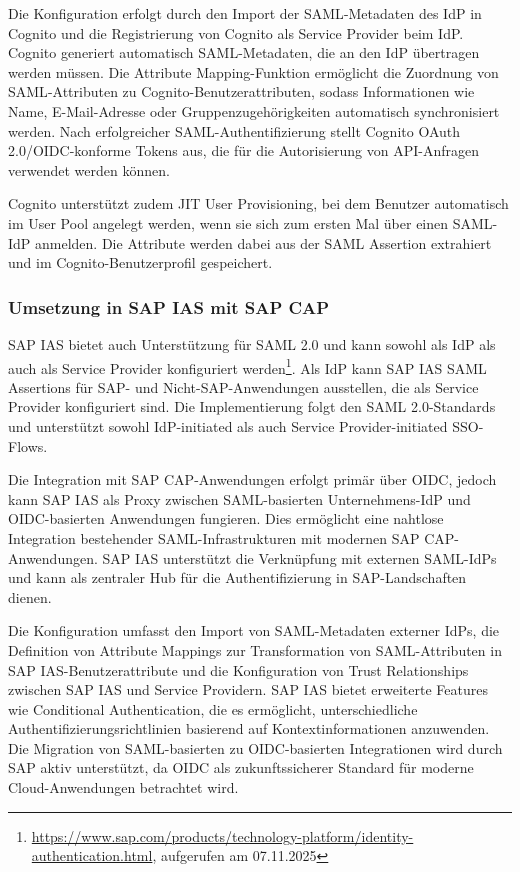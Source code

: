 Die Konfiguration erfolgt durch den Import der \ac{SAML}-Metadaten des \ac{IdP} in Cognito und die Registrierung von Cognito als Service Provider beim \ac{IdP}. Cognito generiert automatisch \ac{SAML}-Metadaten, die an den \ac{IdP} übertragen werden müssen. Die Attribute Mapping-Funktion ermöglicht die Zuordnung von \ac{SAML}-Attributen zu Cognito-Benutzerattributen, sodass Informationen wie Name, E-Mail-Adresse oder Gruppenzugehörigkeiten automatisch synchronisiert werden. Nach erfolgreicher \ac{SAML}-Authentifizierung stellt Cognito OAuth 2.0/\ac{OIDC}-konforme Tokens aus, die für die Autorisierung von API-Anfragen verwendet werden können.

Cognito unterstützt zudem \ac{JIT} User Provisioning, bei dem Benutzer automatisch im User Pool angelegt werden, wenn sie sich zum ersten Mal über einen \ac{SAML}-\ac{IdP} anmelden. Die Attribute werden dabei aus der \ac{SAML} Assertion extrahiert und im Cognito-Benutzerprofil gespeichert.

\subsubsection{Umsetzung in SAP IAS mit SAP CAP}

\ac{SAP IAS} bietet auch Unterstützung für \ac{SAML} 2.0 und kann sowohl als \ac{IdP} als auch als Service Provider konfiguriert werden\footnote{\url{https://www.sap.com/products/technology-platform/identity-authentication.html}, aufgerufen am 07.11.2025}. Als \ac{IdP} kann \ac{SAP IAS} \ac{SAML} Assertions für SAP- und Nicht-SAP-Anwendungen ausstellen, die als Service Provider konfiguriert sind. Die Implementierung folgt den \ac{SAML} 2.0-Standards und unterstützt sowohl \ac{IdP}-initiated als auch Service Provider-initiated \ac{SSO}-Flows.

Die Integration mit \ac{SAP CAP}-Anwendungen erfolgt primär über \ac{OIDC}, jedoch kann \ac{SAP IAS} als Proxy zwischen \ac{SAML}-basierten Unternehmens-\ac{IdP} und \ac{OIDC}-basierten Anwendungen fungieren. Dies ermöglicht eine nahtlose Integration bestehender SAML-Infrastrukturen mit modernen \ac{SAP CAP}-Anwendungen. \ac{SAP IAS} unterstützt die Verknüpfung mit externen \ac{SAML}-\ac{IdP}s und kann als zentraler Hub für die Authentifizierung in SAP-Landschaften dienen.

Die Konfiguration umfasst den Import von \ac{SAML}-Metadaten externer \ac{IdP}s, die Definition von Attribute Mappings zur Transformation von \ac{SAML}-Attributen in \ac{SAP IAS}-Benutzerattribute und die Konfiguration von Trust Relationships zwischen \ac{SAP IAS} und Service Providern. \ac{SAP IAS} bietet erweiterte Features wie Conditional Authentication, die es ermöglicht, unterschiedliche Authentifizierungsrichtlinien basierend auf Kontextinformationen anzuwenden. Die Migration von \ac{SAML}-basierten zu \ac{OIDC}-basierten Integrationen wird durch SAP aktiv unterstützt, da \ac{OIDC} als zukunftssicherer Standard für moderne Cloud-Anwendungen betrachtet wird.

